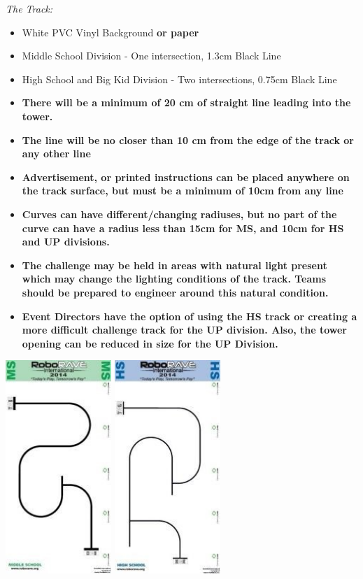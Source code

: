\documentclass[a4paper,12pt]{article}
\begin{document}
\emph{The Track:}
\begin{itemize}
	\item White PVC Vinyl Background \textbf{or paper}
	\item Middle School Division - One intersection, 1.3cm Black Line
	\item High School and Big Kid Division - Two intersections, 0.75cm Black Line
\item \textbf{There will be a minimum of 20 cm of straight line leading into the tower.}
\item \textbf{The line will be no closer than 10 cm from the edge of the track or any other
line}
\item \textbf{Advertisement, or printed instructions can be placed anywhere on the track
surface, but must be a minimum of 10cm from any line}
\item \textbf{Curves can have different/changing radiuses, but no part of the curve can
have a radius less than 15cm for MS, and 10cm for HS and UP divisions.}
\item \textbf{The challenge may be held in areas with natural light present which may
change the lighting conditions of the track. Teams should be prepared to
engineer around this natural condition.}
\item \textbf{Event Directors have the option of using the HS track or creating a more
difficult challenge track for the UP division. Also, the tower opening can be
reduced in size for the UP Division.}
\end{itemize}
\includegraphics[width=0.3\textwidth]{track_ms_lf.png}
\includegraphics[width=0.3\textwidth]{track_hs_lf.png}
\end{document}
